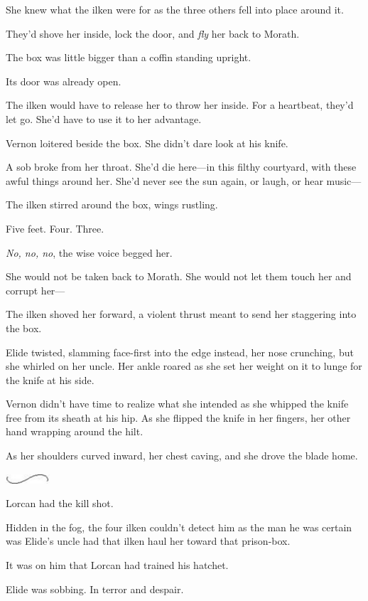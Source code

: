 She knew what the ilken were for as the three others fell into place around it.

They'd shove her inside, lock the door, and \emph{fly} her back to Morath.

The box was little bigger than a coffin standing upright.

Its door was already open.

The ilken would have to release her to throw her inside. For a heartbeat, they'd let go. She'd have to use it to her advantage.

Vernon loitered beside the box. She didn't dare look at his knife.

A sob broke from her throat. She'd die here---in this filthy courtyard, with these awful things around her. She'd never see the sun again, or laugh, or hear music---

The ilken stirred around the box, wings rustling.

Five feet. Four. Three.

\emph{No, no, no}, the wise voice begged her.

She would not be taken back to Morath. She would not let them touch her and corrupt her---

The ilken shoved her forward, a violent thrust meant to send her staggering into the box.

Elide twisted, slamming face-first into the edge instead, her nose crunching, but she whirled on her uncle. Her ankle roared as she set her weight on it to lunge for the knife at his side.

Vernon didn't have time to realize what she intended as she whipped the knife free from its sheath at his hip. As she flipped the knife in her fingers, her other hand wrapping around the hilt.

As her shoulders curved inward, her chest caving, and she drove the blade home.

\includegraphics[width=0.65in,height=0.13in]{images/seperator}

Lorcan had the kill shot.

Hidden in the fog, the four ilken couldn't detect him as the man he was certain was Elide's uncle had that ilken haul her toward that prison-box.

It was on him that Lorcan had trained his hatchet.

Elide was sobbing. In terror and despair.

